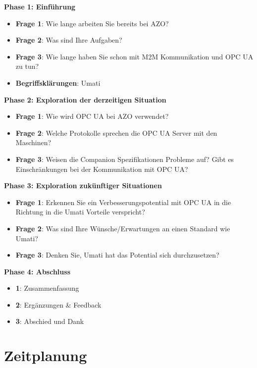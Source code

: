 \documentclass[a4paper, 12pt, oneside]{scrbook}
\begin{document}
	\textbf{Phase 1: Einführung}
	\begin{itemize}
		\item \textbf{Frage 1}: Wie lange arbeiten Sie bereits bei AZO?
		\item \textbf{Frage 2}: Was sind Ihre Aufgaben?
		\item \textbf{Frage 3}: Wie lange haben Sie schon mit M2M Kommunikation und OPC UA zu tun?
		
		\item \textbf{Begriffsklärungen}: Umati
	\end{itemize}
	\textbf{Phase 2: Exploration der derzeitigen Situation}
	\begin{itemize}
		\item \textbf{Frage 1}: Wie wird OPC UA bei AZO verwendet?
		\item \textbf{Frage 2}: Welche Protokolle sprechen die OPC UA Server mit den Maschinen?
		\item \textbf{Frage 3}: Weisen die Companion Spezifikationen Probleme auf? Gibt es Einschränkungen bei der Kommunikation mit OPC UA?
	\end{itemize}
	\textbf{Phase 3: Exploration zukünftiger Situationen}
	\begin{itemize}
		\item \textbf{Frage 1}: Erkennen Sie ein Verbesserungspotential mit OPC UA in die Richtung in die Umati Vorteile verspricht?
		\item \textbf{Frage 2}: Was sind Ihre Wünsche/Erwartungen an einen Standard wie Umati? 
		\item \textbf{Frage 3}: Denken Sie, Umati hat das Potential sich durchzusetzen?
	\end{itemize}
	\textbf{Phase 4: Abschluss}
	\begin{itemize}
		\item \textbf{1}: Zusammenfassung
		\item \textbf{2}: Ergänzungen \& Feedback
		\item \textbf{3}: Abschied und Dank
	\end{itemize}
	
	
	\section{Zeitplanung}
	
\end{document}
